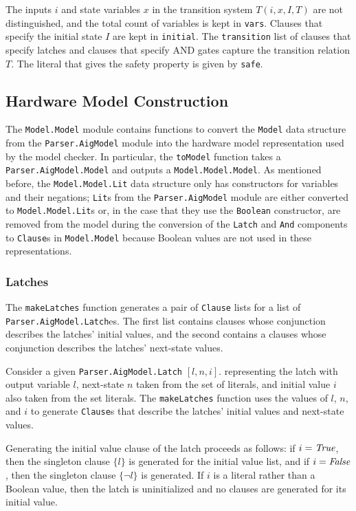 \documentclass[12pt,a4paper,twoside,openright]{report}
\begin{document}
{The inputs $i$ and state variables $x$ in the transition system $T(i,x,I,T)$
are not distinguished, and the total count of variables is kept in \verb,vars,.
Clauses that specify the initial state $I$ are kept in \verb,initial,.
The \verb,transition, list of clauses that specify latches and clauses that specify AND
gates capture the transition relation $T$.
The literal that gives the safety property is given by \verb,safe,.

\subsection{Hardware Model Construction}

The \verb,Model.Model, module contains functions to convert the \verb,Model, data
structure from the \verb,Parser.AigModel, module into the hardware model representation used by
the model checker. In particular, the \verb,toModel, function takes a \verb,Parser.AigModel.Model,
and outputs a \verb,Model.Model.Model,. As mentioned before, the \verb,Model.Model.Lit,
data structure only has constructors for variables and their negations; \verb,Lit,s from
the \verb,Parser.AigModel, module are either converted to \verb,Model.Model.Lit,s or, in the case
that they use the \verb,Boolean, constructor, are removed from the model during the conversion of
the \verb,Latch, and \verb,And, components to \verb,Clause,s in \verb,Model.Model, because
Boolean values are not used in these representations.

\subsubsection{Latches}
The \verb,makeLatches, function generates a pair of \verb,Clause, lists
for a list of \verb,Parser.AigModel.Latch,es. The first list contains
clauses whose conjunction describes the latches' initial values,
and the second contains a clauses whose conjunction describes the
latches' next-state values.

Consider a given \verb,Parser.AigModel.Latch, $[l, n, i]$. representing the latch with
output variable $l$, next-state $n$ taken from the set of literals,
and initial value $i$
also taken from the set literals. The \verb,makeLatches, function uses the
values of $l$, $n$, and $i$ to generate \verb,Clause,s that describe the latches' initial values and
next-state values.

Generating the initial value clause of the latch proceeds as follows: if $i = {\it True}$,
then the singleton clause $\{l\}$ is generated for the initial value list, and if $i = {\it False}$,
then the singleton clause $\{\neg l\}$ is generated.
If $i$ is a literal rather than a Boolean value, then the latch is
uninitialized and no clauses are generated for its initial value.

}
\end{document}
